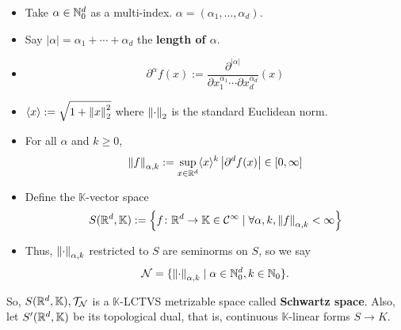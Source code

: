 \documentclass[11pt,leqno,oneside]{amsbook}
\numberwithin{thm}{section}
\newcommand{\Top}{\mathcal{T}} %
\newcommand{\cN}{\mathcal{N}}
\newcommand{\norms}{\cN}
\renewcommand{\de}{\textbf} %
\begin{document}
\begin{defn}
  \begin{itemize}
  \item Take \(\alpha \in \N_0^d\) as a multi-index. \(\alpha =
    (\alpha_1, \ldots, \alpha_d)\).
  \item Say \(|\alpha| = \alpha_1 + \cdots + \alpha_d\) the \de{length
      of \(\alpha\)}.
  \item \[
      \partial^\alpha f(x) := \frac{\partial^{|\alpha|}}{\partial
        x_1^{\alpha_1} \cdots \partial x_d^{\alpha_d}}(x)
    \]
  \item \(\langle x \rangle := \sqrt{1+\norm[x]_2^2}\) where
    \(\norm_2\) is the standard Euclidean norm.
  \item For all \(\alpha\) and \(k \geq 0\), \[
      \norm[f]_{\alpha,k} := \sup_{x \in \R^d} \langle x \rangle^k
      \left| \partial^d f(x) \right| \in [0,\infty]
    \]
  \item Define the \(\mathbb{K}\)-vector space \[
      S(\R^d,\mathbb{K}) := \left\{ f \from \R^d \to \mathbb{K} \in
        \mathcal{C}^\infty \st \forall \alpha, k, \norm[f]_{\alpha,k}
        < \infty \right\}
    \]
  \item Thus, \(\norm_{\alpha,k}\) restricted to \(S\) are seminorms
    on \(S\), so we say \[
      \norms = \{\norm_{\alpha,k} \st \alpha \in \N_0^d, k \in \N_0\}.
    \]
  \end{itemize}
  So, \(S(\R^d,\mathbb{K}), \Top_\norms\) is a \(\mathbb{K}\)-LCTVS
  metrizable space called \de{Schwartz space}. Also, let
  \(S'(\R^d,\mathbb{K})\) be its topological dual, that is, continuous
  \(\mathbb{K}\)-linear forms \(S \to K\).
\end{defn}
\end{document}
